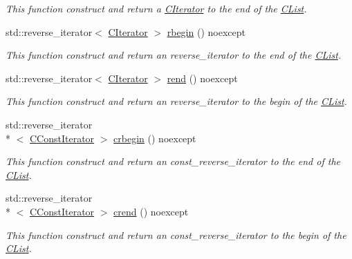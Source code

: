 \begin{DoxyCompactItemize}
\begin{DoxyCompactList}\small\item\em This function construct and return a \hyperlink{structnsSdD_1_1CList_1_1CIterator}{C\+Iterator} to the end of the \hyperlink{classnsSdD_1_1CList}{C\+List}. \end{DoxyCompactList}\item 
std\+::reverse\+\_\+iterator$<$ \hyperlink{structnsSdD_1_1CList_1_1CIterator}{C\+Iterator} $>$ \hyperlink{classnsSdD_1_1CList_a763731bf428359807d4c35f21ed1ac4e}{rbegin} () noexcept
\begin{DoxyCompactList}\small\item\em This function construct and return an reverse\+\_\+iterator to the end of the \hyperlink{classnsSdD_1_1CList}{C\+List}. \end{DoxyCompactList}\item 
std\+::reverse\+\_\+iterator$<$ \hyperlink{structnsSdD_1_1CList_1_1CIterator}{C\+Iterator} $>$ \hyperlink{classnsSdD_1_1CList_a971d1f0ea06ae04c61303705f05a4211}{rend} () noexcept
\begin{DoxyCompactList}\small\item\em This function construct and return an reverse\+\_\+iterator to the begin of the \hyperlink{classnsSdD_1_1CList}{C\+List}. \end{DoxyCompactList}\item 
std\+::reverse\+\_\+iterator\\*
$<$ \hyperlink{structnsSdD_1_1CList_1_1CConstIterator}{C\+Const\+Iterator} $>$ \hyperlink{classnsSdD_1_1CList_a2a94cede3e75928a314fd6943a07c867}{crbegin} () noexcept
\begin{DoxyCompactList}\small\item\em This function construct and return an const\+\_\+reverse\+\_\+iterator to the end of the \hyperlink{classnsSdD_1_1CList}{C\+List}. \end{DoxyCompactList}\item 
std\+::reverse\+\_\+iterator\\*
$<$ \hyperlink{structnsSdD_1_1CList_1_1CConstIterator}{C\+Const\+Iterator} $>$ \hyperlink{classnsSdD_1_1CList_a9c0b9c73483ef340921ac38aa3674d25}{crend} () noexcept
\begin{DoxyCompactList}\small\item\em This function construct and return an const\+\_\+reverse\+\_\+iterator to the begin of the \hyperlink{classnsSdD_1_1CList}{C\+List}. \end{DoxyCompactList}\item 

\end{DoxyCompactItemize}
